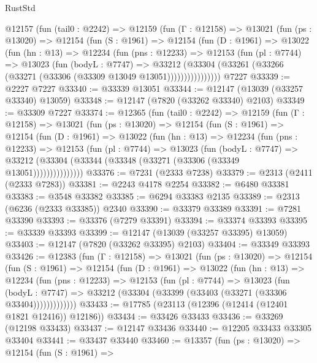 \begin{lexlean}{RustStd}
\begin{coremodule}
    @12157
      (fun (tail0 : @2242) =>
      @12159
        (fun (Γ : @12158) =>
        @13021
          (fun (ps : @13020) =>
          @12154
            (fun (S : @1961) =>
            @12154
              (fun (D : @1961) =>
              @13022
                (fun (hn : @13) =>
                @12234
                  (fun (pns : @12233) =>
                  @12153
                    (fun (pl : @7744) =>
                    @13023
                      (fun (bodyL : @7747) =>
                      @33212
                        (@33304
                          (@33261 (@33266 (@33271 (@33306 (@33309 @13049 @13051))))))))))))))))
    @7227
@33339 := @2227 @7227
@33340 := @33339 @13051
@33344 := @12147 (@13039 (@33257 @33340) @13059)
@33348 := @12147 (@7820 (@33262 @33340) @2103)
@33349 := @33309 @7227
@33374 := @12365
    (fun (tail0 : @2242) =>
    @12159
      (fun (Γ : @12158) =>
      @13021
        (fun (ps : @13020) =>
        @12154
          (fun (S : @1961) =>
          @12154
            (fun (D : @1961) =>
            @13022
              (fun (hn : @13) =>
              @12234
                (fun (pns : @12233) =>
                @12153
                  (fun (pl : @7744) =>
                  @13023
                    (fun (bodyL : @7747) =>
                    @33212 (@33304 (@33344 (@33348 (@33271 (@33306 (@33349 @13051)))))))))))))))
@33376 := @7231 (@2333 @7238)
@33379 := @2313 (@2411 (@2333 @7283))
@33381 := @2243 @4178 @2254
@33382 := @6480 @33381
@33383 := @3548 @33382
@33385 := @6294 @33383 @2135
@33389 := @2313 (@6236 (@2333 @33385)) @2340
@33390 := @33379 @33389
@33391 := @7281 @33390
@33393 := @33376 (@7279 @33391)
@33394 := @33374 @33393
@33395 := @33339 @33393
@33399 := @12147 (@13039 (@33257 @33395) @13059)
@33403 := @12147 (@7820 (@33262 @33395) @2103)
@33404 := @33349 @33393
@33426 := @12383
    (fun (Γ : @12158) =>
    @13021
      (fun (ps : @13020) =>
      @12154
        (fun (S : @1961) =>
        @12154
          (fun (D : @1961) =>
          @13022
            (fun (hn : @13) =>
            @12234
              (fun (pns : @12233) =>
              @12153
                (fun (pl : @7744) =>
                @13023
                  (fun (bodyL : @7747) =>
                  @33212 (@33304 (@33399 (@33403 (@33271 (@33306 @33404)))))))))))))
@33433 := @17785 (@23113 (@12396 (@12414 (@12401 @1821 @12416)) @12186))
@33434 := @33426 @33433
@33436 := @33269 (@12198 @33433)
@33437 := @12147 @33436
@33440 := @12205 @33433 @33305 @33404
@33441 := @33437 @33440
@33460 := @13357
    (fun (ps : @13020) =>
    @12154
      (fun (S : @1961) =>

\end{coremodule}
\end{lexlean}
